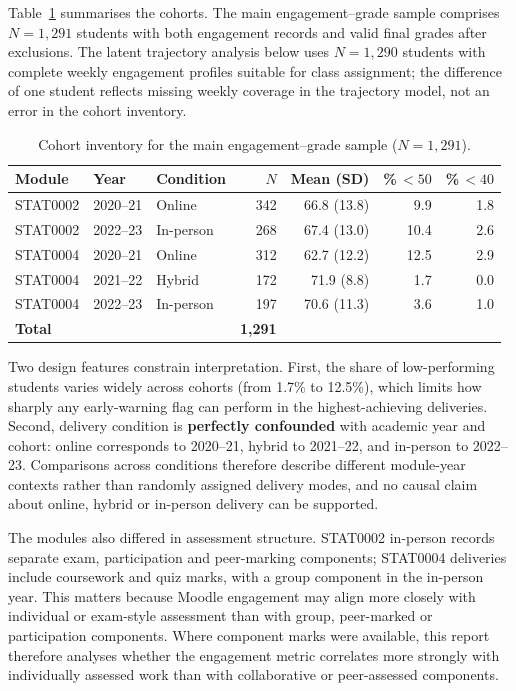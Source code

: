 \documentclass[11pt,a4paper]{article}
\newcommand{\srcnote}{\par\smallskip{\footnotesize\textit{Source: author's analysis of UCL Moodle log data.}}}
\begin{document}
Table~\ref{tab:inventory} summarises the cohorts. The main engagement--grade
sample comprises $N=1{,}291$ students with both engagement records and valid
final grades after exclusions. The latent trajectory analysis below uses
$N=1{,}290$ students with complete weekly engagement profiles suitable for class
assignment; the difference of one student reflects missing weekly coverage in
the trajectory model, not an error in the cohort inventory.

\begin{table}[H]
\centering
\caption{Cohort inventory for the main engagement--grade sample ($N=1{,}291$).}
\label{tab:inventory}
\small
\begin{tabular}{lllrrrr}
\toprule
Module & Year & Condition & $N$ & Mean (SD) & \%\,$<50$ & \%\,$<40$ \\
\midrule
STAT0002 & 2020--21 & Online    & 342 & 66.8 (13.8) & 9.9  & 1.8 \\
STAT0002 & 2022--23 & In-person & 268 & 67.4 (13.0) & 10.4 & 2.6 \\
STAT0004 & 2020--21 & Online    & 312 & 62.7 (12.2) & 12.5 & 2.9 \\
STAT0004 & 2021--22 & Hybrid    & 172 & 71.9 (8.8)  & 1.7  & 0.0 \\
STAT0004 & 2022--23 & In-person & 197 & 70.6 (11.3) & 3.6  & 1.0 \\
\midrule
\multicolumn{3}{l}{\textbf{Total}} & \textbf{1{,}291} & & & \\
\bottomrule
\end{tabular}
\srcnote
\end{table}

Two design features constrain interpretation. First, the share of low-performing
students varies widely across cohorts (from 1.7\% to 12.5\%), which limits how
sharply any early-warning flag can perform in the highest-achieving deliveries.
Second, delivery condition is \textbf{perfectly confounded} with academic year and
cohort: online corresponds to 2020--21, hybrid to 2021--22, and in-person to
2022--23. Comparisons across conditions therefore describe different module-year
contexts rather than randomly assigned delivery modes, and no causal claim about
online, hybrid or in-person delivery can be supported.

The modules also differed in assessment structure. STAT0002 in-person records
separate exam, participation and peer-marking components; STAT0004 deliveries
include coursework and quiz marks, with a group component in the in-person year.
This matters because Moodle engagement may align more closely with
individual or exam-style assessment than with group, peer-marked or participation
components. Where component marks were available, this report therefore analyses
whether the engagement metric correlates more strongly with individually assessed
work than with collaborative or peer-assessed components.
\end{document}
